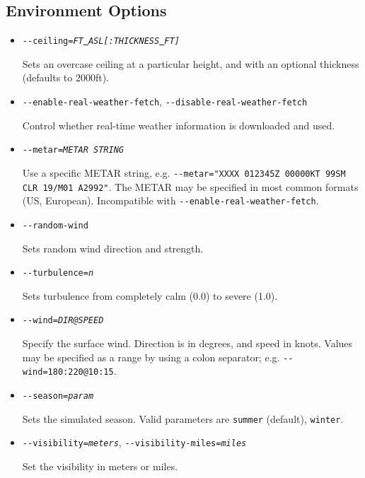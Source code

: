 {

  \subsection{Environment Options}
  \begin{itemize}
  \item{\texttt{-$ $-ceiling={\it FT\underline{~}ASL[:THICKNESS\underline{~}FT]}}}

  Sets an overcase ceiling at a particular height, and with an optional thickness (defaults to 2000ft).

  \item{\texttt{-$ $-enable-real-weather-fetch}, \texttt{-$ $-disable-real-weather-fetch}}

  Control whether real-time weather information is downloaded and used.

  \item{\texttt{-$ $-metar={\it METAR STRING}}}

  Use a specific METAR string, e.g. \texttt{-$ $-metar="XXXX 012345Z 00000KT 99SM CLR 19/M01 A2992"}. The METAR may
  be specified in most common formats (US, European). Incompatible with \texttt{-$ $-enable-real-weather-fetch}.

  \item{\texttt{-$ $-random-wind}}

  Sets random wind direction and strength.

  \item{\texttt{-$ $-turbulence={\it n}}}

  Sets turbulence from completely calm (0.0) to severe (1.0).

  \item{\texttt{-$ $-wind={\it DIR@SPEED}}}

  Specify the surface wind. Direction is in degrees, and speed in knots. Values may be specified as a range
  by using a colon separator; e.g. \texttt{-$ $-wind=180:220@10:15}.

  \item{\texttt{-$ $-season={\it param}}}

  Sets the simulated season. Valid parameters are \texttt{summer} (default), \texttt{winter}.

  \item{\texttt{-$ $-visibility={\it meters}}, \texttt{-$ $-visibility-miles={\it miles}}}

  Set the visibility in meters or miles.

  \end{itemize}
}

